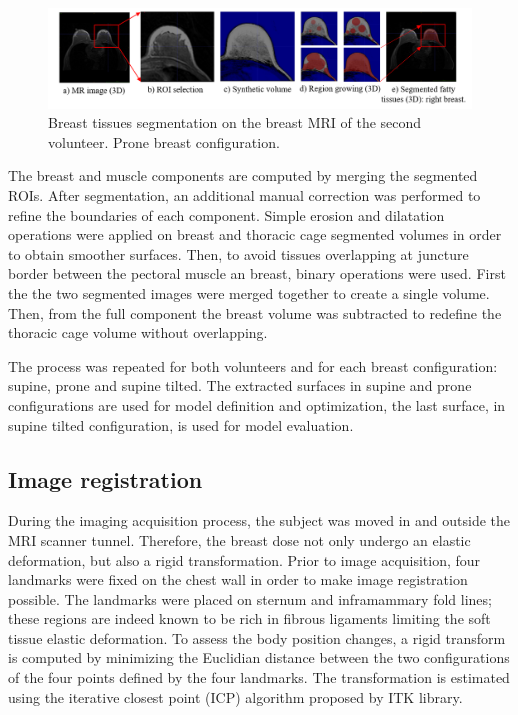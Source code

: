  
 \begin{figure}[h]
\centering
\includegraphics[width=1\textwidth,keepaspectratio]{figures/tissues_segmentation.png} 
\caption{Breast tissues segmentation on the breast MRI of the second volunteer. Prone breast configuration.} \label{fig:breasttissuessegmentation}
\end{figure}

The breast and muscle components are computed by merging the segmented ROIs. After segmentation, an additional manual correction was performed to refine the boundaries of each component. Simple erosion and dilatation operations were applied on breast and thoracic cage segmented volumes in order to obtain smoother surfaces. Then, to avoid tissues overlapping at juncture border between the pectoral muscle an breast, binary operations were used. First the the two segmented images were merged together to create a single volume. Then, from the full component the breast volume was subtracted to redefine the thoracic cage volume without overlapping.
 
The process was repeated for both volunteers and for each breast configuration: supine, prone and supine tilted. The extracted surfaces in supine and prone configurations are used for model definition and optimization,  the last surface, in supine tilted configuration, is used for model evaluation. 

\subsection{Image registration}\label{subsection:image registration}

During the imaging acquisition process, the subject was moved in and outside the MRI scanner tunnel. Therefore, the breast dose not only undergo an elastic deformation, but also a rigid transformation. Prior to image acquisition, four landmarks were fixed on the chest wall in order to make image registration possible.  The landmarks were placed on sternum and inframammary fold lines; these regions are indeed known to be rich in fibrous ligaments limiting the soft tissue elastic deformation.  To assess the body position changes, a rigid transform is computed by minimizing the Euclidian distance between the two configurations of the four points defined by the four landmarks. The transformation is estimated using the iterative closest point (ICP) algorithm proposed by ITK library.

